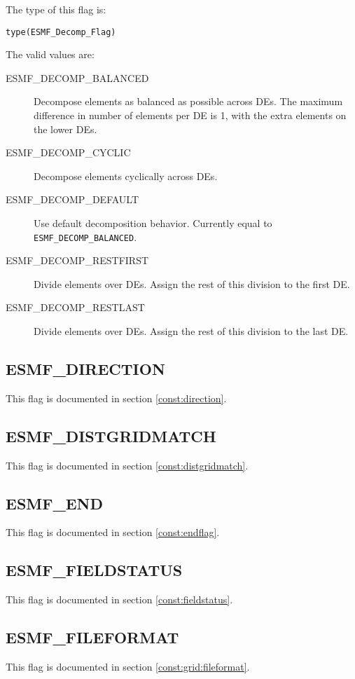 The type of this flag is:

{\tt type(ESMF\_Decomp\_Flag)}

The valid values are:
\begin{description}
\item [ESMF\_DECOMP\_BALANCED]
      Decompose elements as balanced as possible across DEs. The maximum 
      difference in number of elements per DE is 1, with the extra elements on
      the lower DEs.
\item [ESMF\_DECOMP\_CYCLIC]
      Decompose elements cyclically across DEs.
\item [ESMF\_DECOMP\_DEFAULT]
      Use default decomposition behavior. Currently equal to 
      {\tt ESMF\_DECOMP\_BALANCED}.
\item [ESMF\_DECOMP\_RESTFIRST]
      Divide elements over DEs. Assign the rest of this division to the first
      DE.
\item [ESMF\_DECOMP\_RESTLAST]
      Divide elements over DEs. Assign the rest of this division to the last DE.
\end{description}

\subsection{ESMF\_DIRECTION}
This flag is documented in section \ref{const:direction}.

\subsection{ESMF\_DISTGRIDMATCH}
This flag is documented in section \ref{const:distgridmatch}.

\subsection{ESMF\_END}

This flag is documented in section \ref{const:endflag}.

\subsection{ESMF\_FIELDSTATUS}
This flag is documented in section \ref{const:fieldstatus}.

\subsection{ESMF\_FILEFORMAT}
This flag is documented in section \ref{const:grid:fileformat}.

